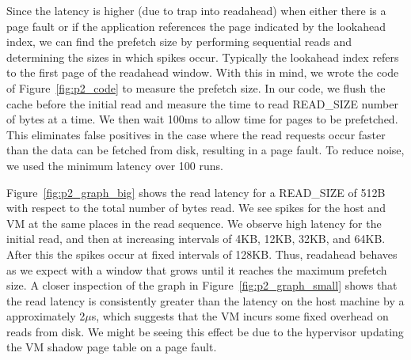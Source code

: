 Since the latency is higher (due to trap into readahead) when either there is a page 
fault or if the application references the page indicated by the lookahead index,
we can find the prefetch size by performing sequential reads and determining
the sizes in which spikes occur. Typically the lookahead index refers to the first 
page of the readahead window. With this in mind, we wrote the code of 
Figure~\ref{fig:p2_code} to measure the prefetch size. In our code, we flush 
the cache before the initial read and measure the time to read READ\_SIZE number of
bytes at a time. We then wait 100ms to allow time for pages to be prefetched. This
eliminates false positives in the case where the read requests occur faster than
the data can be fetched from disk, resulting in a page fault. To reduce noise,
we used the minimum latency over 100 runs.

Figure~\ref{fig:p2_graph_big} shows the read latency for a READ\_SIZE of 512B with
respect to the total number of bytes read. We see spikes for the host and VM at the
same places in the read sequence. We observe high latency for the initial read, and
then at increasing intervals of 4KB, 12KB, 32KB, and 64KB. After this the spikes 
occur at fixed intervals of 128KB. Thus, readahead behaves as we expect with a
window that grows until it reaches the maximum prefetch size. 
A closer inspection of the graph in Figure~\ref{fig:p2_graph_small} shows that the 
read latency is consistently greater than the latency on the host machine by a 
approximately 2$\mu$s, which suggests that the VM incurs some fixed overhead on 
reads from disk. We might be seeing this effect be due to the hypervisor updating the VM shadow page 
table on a page fault.




